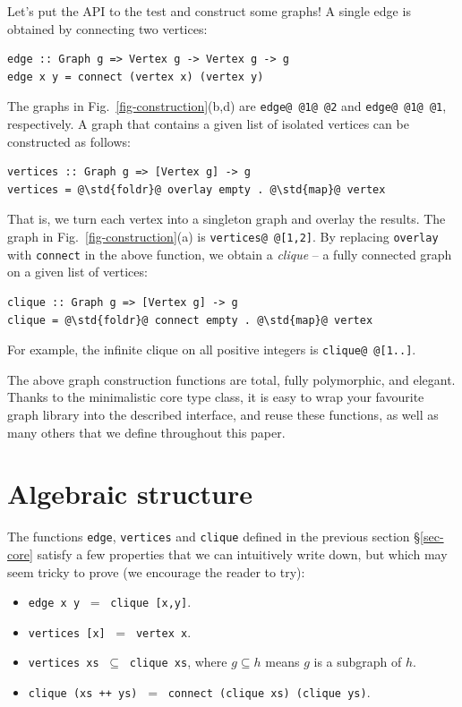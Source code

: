 \documentclass[acmlarge,anonymous]{acmart}\settopmatter{printfolios=true}
\newcommand{\hs}{\texttt}
\newcommand{\std}[1]{{\color[rgb]{0,0,0.6} #1}}
\begin{document}
Let's put the API to the test and construct some graphs! A single edge is
obtained by connecting two vertices:

\begin{verbatim}
edge :: Graph g => Vertex g -> Vertex g -> g
edge x y = connect (vertex x) (vertex y)
\end{verbatim}

\noindent
The graphs in Fig.~\ref{fig-construction}(b,d) are \hs{edge@\,@1@\,@2} and
\hs{edge@\,@1@\,@1}, respectively.
A graph that contains a given list of isolated vertices can be constructed
as follows:

\begin{verbatim}
vertices :: Graph g => [Vertex g] -> g
vertices = @\std{foldr}@ overlay empty . @\std{map}@ vertex
\end{verbatim}

\noindent
That is, we turn each vertex into a singleton graph and overlay the results.
The graph in Fig.~\ref{fig-construction}(a) is \hs{vertices@\,@[1,2]}.
By replacing \hs{overlay} with \hs{connect} in the above
function, we obtain a \emph{clique} -- a fully connected graph on a given list
of vertices:

\begin{verbatim}
clique :: Graph g => [Vertex g] -> g
clique = @\std{foldr}@ connect empty . @\std{map}@ vertex
\end{verbatim}

\noindent
For example, the infinite clique on all positive integers is \hs{clique@\,@[1..]}.

The above graph construction functions are total, fully polymorphic, and elegant.
Thanks to the minimalistic core type class, it is easy to wrap your favourite
graph library into the described interface, and reuse these functions, as well
as many others that we define throughout this paper.

\section{Algebraic structure}\label{sec-algebra}

The functions \hs{edge}, \hs{vertices} and \hs{clique} defined in the previous
section \S\ref{sec-core} satisfy a few properties that we can intuitively write down,
but which may seem tricky to prove (we encourage the reader to try):
\begin{itemize}
    \item \hs{edge x y} $\ =\ $ \hs{clique [x,y]}.
    \item \hs{vertices [x]} $\ =\ $ \hs{vertex x}.
    \item \hs{vertices xs} $\ \subseteq\ $ \hs{clique xs}, where $g \subseteq h$ means
    $g$ is a subgraph of $h$.
    \item \hs{clique (xs ++ ys)} $\ =\ $ \hs{connect (}\hs{clique xs) (}\hs{clique ys)}.
\end{itemize}
\end{document}
